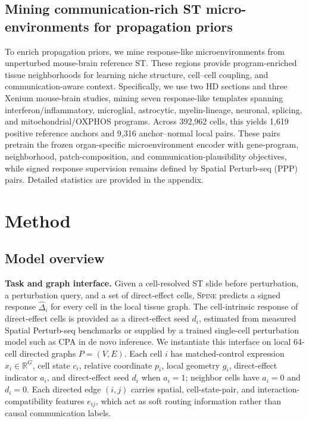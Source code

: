 \documentclass[sigconf,review,balance=false]{acmart}
\newcommand{\methodname}{\textsc{Spine}\xspace}
\begin{document}
\subsection{Mining communication-rich ST micro-environments for propagation priors}
\label{sec:st_microenvironment_mining}
To enrich propagation priors, we mine response-like microenvironments from unperturbed mouse-brain reference ST. These regions provide program-enriched tissue neighborhoods for learning niche structure, cell--cell coupling, and communication-aware context. Specifically, we use two HD sections and three Xenium mouse-brain studies, mining seven response-like templates spanning interferon/inflammatory, microglial, astrocytic, myelin-lineage, neuronal, splicing, and mitochondrial/OXPHOS programs. Across 392{,}962 cells, this yields 1{,}619 positive reference anchors and 9{,}316 anchor--normal local pairs. These pairs pretrain the frozen organ-specific microenvironment encoder with gene-program, neighborhood, patch-composition, and communication-plausibility objectives, while signed response supervision remains defined by Spatial Perturb-seq (PPP) pairs. Detailed statistics are provided in the appendix.
\section{Method}
\label{sec:method}

\subsection{Model overview}
\label{sec:method_overview}

\noindent\textbf{Task and graph interface.}
Given a cell-resolved ST slide before perturbation, a perturbation query, and a set of direct-effect cells, \methodname{} predicts a signed response $\widehat\Delta_i$ for every cell in the local tissue graph. The cell-intrinsic response of direct-effect cells is provided as a direct-effect seed $d_i$, estimated from measured Spatial Perturb-seq benchmarks or supplied by a trained single-cell perturbation model such as CPA in de novo inference. We instantiate this interface on local 64-cell directed graphs $P=(V,E)$. Each cell $i$ has matched-control expression $x_i\in\mathbb{R}^G$, cell state $c_i$, relative coordinate $p_i$, local geometry $g_i$, direct-effect indicator $a_i$, and direct-effect seed $d_i$ when $a_i=1$; neighbor cells have $a_i=0$ and $d_i=0$. Each directed edge $(i,j)$ carries spatial, cell-state-pair, and interaction-compatibility features $e_{ij}$, which act as soft routing information rather than causal communication labels.
\end{document}
